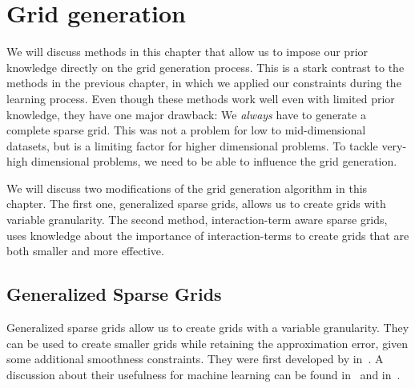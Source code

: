 \chapter{Grid generation}\label{cha:grid-gen}
We will discuss methods in this chapter that allow us to impose our prior knowledge directly on the grid generation process.
This is a stark contrast to the methods in the previous chapter, in which we applied our constraints during the learning process.
Even though these methods work well even with limited prior knowledge, they have one major drawback:
We \emph{always} have to generate a complete sparse grid.
This was not a problem for low to mid-dimensional datasets, but is a limiting factor for higher dimensional problems.
To tackle very-high dimensional problems, we need to be able to influence the
grid generation.

We will discuss two modifications of the grid generation algorithm in this
chapter.
The first one, generalized sparse grids, allows us to create grids with variable granularity.
The second method, interaction-term aware sparse grids, uses knowledge about the
importance of interaction-terms to create grids that are both smaller and more effective.
\section{Generalized Sparse Grids}\label{sec:generalised-sg}
Generalized sparse grids allow us to create grids with a variable granularity.
They can be used to create smaller grids while retaining the approximation
error, given some additional smoothness constraints.
They were first developed by \citeauthor{optimizedApproxSpaces} in~\cite{optimizedApproxSpaces}.
A discussion about their usefulness for machine learning can be found
in~\cite{sparse-reconstruction} and in~\cite{sparse-parsimony}.

